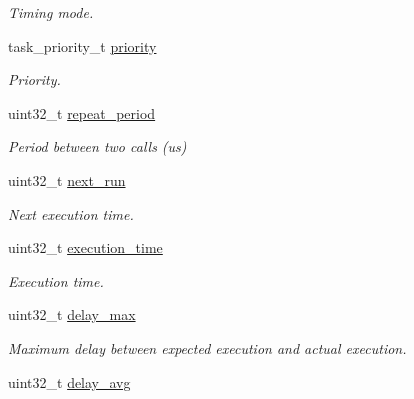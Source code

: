 \begin{DoxyCompactItemize}
\begin{DoxyCompactList}\small\item\em Timing mode. \end{DoxyCompactList}\item 
\hypertarget{structtask__entry__t_a40794d4ddb385bee8ab1bfe499a1ea19}{task\+\_\+priority\+\_\+t \hyperlink{structtask__entry__t_a40794d4ddb385bee8ab1bfe499a1ea19}{priority}}\label{structtask__entry__t_a40794d4ddb385bee8ab1bfe499a1ea19}

\begin{DoxyCompactList}\small\item\em Priority. \end{DoxyCompactList}\item 
\hypertarget{structtask__entry__t_aa41c24011386954e4dc29ceff2e4ffd1}{uint32\+\_\+t \hyperlink{structtask__entry__t_aa41c24011386954e4dc29ceff2e4ffd1}{repeat\+\_\+period}}\label{structtask__entry__t_aa41c24011386954e4dc29ceff2e4ffd1}

\begin{DoxyCompactList}\small\item\em Period between two calls (us) \end{DoxyCompactList}\item 
\hypertarget{structtask__entry__t_a1acc4a1314f84326105456166f598d0d}{uint32\+\_\+t \hyperlink{structtask__entry__t_a1acc4a1314f84326105456166f598d0d}{next\+\_\+run}}\label{structtask__entry__t_a1acc4a1314f84326105456166f598d0d}

\begin{DoxyCompactList}\small\item\em Next execution time. \end{DoxyCompactList}\item 
\hypertarget{structtask__entry__t_aa14db6e9d1de92e877694bbeb29d9c4e}{uint32\+\_\+t \hyperlink{structtask__entry__t_aa14db6e9d1de92e877694bbeb29d9c4e}{execution\+\_\+time}}\label{structtask__entry__t_aa14db6e9d1de92e877694bbeb29d9c4e}

\begin{DoxyCompactList}\small\item\em Execution time. \end{DoxyCompactList}\item 
\hypertarget{structtask__entry__t_a43d3e4d84bad48e349debca2f041a473}{uint32\+\_\+t \hyperlink{structtask__entry__t_a43d3e4d84bad48e349debca2f041a473}{delay\+\_\+max}}\label{structtask__entry__t_a43d3e4d84bad48e349debca2f041a473}

\begin{DoxyCompactList}\small\item\em Maximum delay between expected execution and actual execution. \end{DoxyCompactList}\item 
\hypertarget{structtask__entry__t_af86c19fab24a31c936148afc9bb5b52f}{uint32\+\_\+t \hyperlink{structtask__entry__t_af86c19fab24a31c936148afc9bb5b52f}{delay\+\_\+avg}}\label{structtask__entry__t_af86c19fab24a31c936148afc9bb5b52f}


\end{DoxyCompactItemize}

